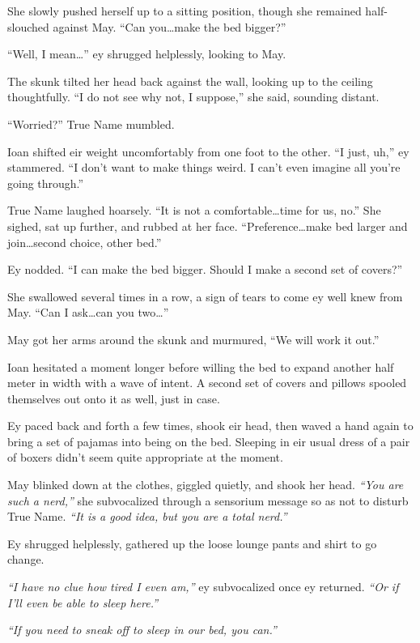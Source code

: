 She slowly pushed herself up to a sitting position, though she remained half-slouched against May. ``Can you\ldots make the bed bigger?''

``Well, I mean\ldots{}'' ey shrugged helplessly, looking to May.

The skunk tilted her head back against the wall, looking up to the ceiling thoughtfully. ``I do not see why not, I suppose,'' she said, sounding distant.

``Worried?'' True Name mumbled.

Ioan shifted eir weight uncomfortably from one foot to the other. ``I just, uh,'' ey stammered. ``I don't want to make things weird. I can't even imagine all you're going through.''

True Name laughed hoarsely. ``It is not a comfortable\ldots time for us, no.'' She sighed, sat up further, and rubbed at her face. ``Preference\ldots make bed larger and join\ldots second choice, other bed.''

Ey nodded. ``I can make the bed bigger. Should I make a second set of covers?''

She swallowed several times in a row, a sign of tears to come ey well knew from May. ``Can I ask\ldots can you two\ldots{}''

May got her arms around the skunk and murmured, ``We will work it out.''

Ioan hesitated a moment longer before willing the bed to expand another half meter in width with a wave of intent. A second set of covers and pillows spooled themselves out onto it as well, just in case.

Ey paced back and forth a few times, shook eir head, then waved a hand again to bring a set of pajamas into being on the bed. Sleeping in eir usual dress of a pair of boxers didn't seem quite appropriate at the moment.

May blinked down at the clothes, giggled quietly, and shook her head. \emph{``You are such a nerd,''} she subvocalized through a sensorium message so as not to disturb True Name. \emph{``It is a good idea, but you are a total nerd.''}

Ey shrugged helplessly, gathered up the loose lounge pants and shirt to go change.

\emph{``I have no clue how tired I even am,''} ey subvocalized once ey returned. \emph{``Or if I'll even be able to sleep here.''}

\emph{``If you need to sneak off to sleep in our bed, you can.''}

